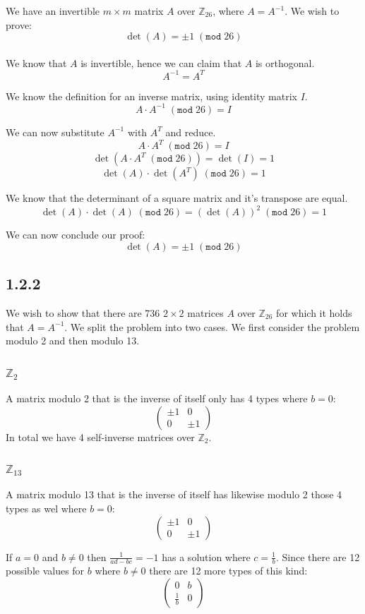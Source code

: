 \documentclass[11pt]{report}
\begin{document}
We have an invertible $m \times m$ matrix $A$ over $\mathbb{Z}_{26}$, where $A = A^{-1}$. We wish to prove:
$$\det(A) = \pm 1\;(\mathtt{mod}\;26)$$
\\
We know that $A$ is invertible, hence we can claim that $A$ is orthogonal.
$$A^{-1}=A^T$$

We know the definition for an inverse matrix, using identity matrix $I$.
$$A \cdot A^{-1}\;(\mathtt{mod}\;26) = I$$

We can now substitute $A^{-1}$ with $A^T$ and reduce.
$$A \cdot A^T\;(\mathtt{mod}\;26)= I$$
$$\det(A \cdot A^T\;(\mathtt{mod}\;26)) = \det(I) = 1$$
$$\det(A) \cdot \det(A^T)\;(\mathtt{mod}\;26) = 1$$

We know that the determinant of a square matrix and it's transpose are equal.
$$\det(A) \cdot \det(A)\;(\mathtt{mod}\;26) = (\det(A))^2\;(\mathtt{mod}\;26) = 1$$

We can now conclude our proof:
$$\det(A) = \pm 1\;(\mathtt{mod}\;26)$$

\subsection*{1.2.2}
We wish to show that there are 736 $2 \times 2$ matrices $A$ over $\mathbb{Z}_{26}$ for which it holds that $A= A^{-1}$. We split the problem into two cases. We first consider the problem modulo 2 and then modulo 13.

\subsubsection*{$\mathbb{Z}_{2}$}
A matrix modulo 2 that is the inverse of itself only has 4 types where $b = 0$:
$$\begin{pmatrix}
\pm 1 & 0\\
0 & \pm 1
\end{pmatrix}$$
In total we have 4 self-inverse matrices over $\mathbb{Z}_{2}$.

\subsubsection*{$\mathbb{Z}_{13}$}
A matrix modulo 13 that is the inverse of itself has likewise modulo 2 those 4 types as wel where $b = 0$:\\
$$\begin{pmatrix}
\pm 1 & 0\\
0 & \pm 1
\end{pmatrix}$$

If $a = 0$ and $b \neq 0$ then $\frac{1}{ad - bc} = -1$ has a solution where $c=\frac{1}{b}$. Since there are 12 possible values for $b$ where $b \neq 0$ there are 12 more types of this kind:\\
$$\begin{pmatrix}
0 & b\\
\frac{1}{b} & 0
\end{pmatrix}$$
\end{document}
